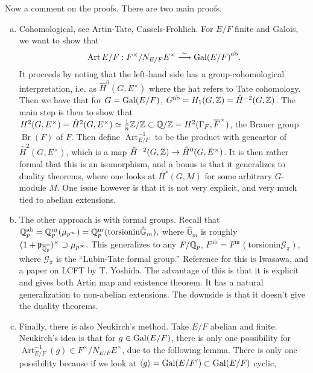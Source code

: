 Now a comment on the proofs. There are two main proofs.
\begin{enumerate}[(a)]
  \item Cohomological, see Artin-Tate, Cassels-Frohlich. For $E/F$ finite and
    Galois, we want to show that \[ \operatorname{Art}{E/F} : F^\times/N_{E/F}
    E^\times \stackrel{\sim}{\longrightarrow} \mathrm{Gal}{(E / F)}^{\operatorname{ab}}. \] It proceeds by noting
    that the left-hand side has a group-cohomological interpretation, i.e. as
    $\hat{H}^0(G, E^\times)$ where the hat refers to Tate cohomology. Then we
    have that for $G = \mathrm{Gal}{(E / F)}$, $G^{\operatorname{ab}} = H_1(G, \mathbb{Z}) =
    \hat{H}^{-2}(G, \mathbb{Z})$. The main step is then to show that $H^2(G,
    E^\times) = \hat{H}^2(G, E^\times) \simeq \frac{1}{n} \mathbb{Z}/\mathbb{Z} \subset
    \mathbb{Q}/\mathbb{Z} = H^2(\Gamma_F, \overline{F}^\times)$, the Brauer group
    $\operatorname{Br}(F)$ of $F$. Then define $\operatorname{Art}_{E/F}^{-1}$
    to be the product with geneartor of $\hat{H}^2(G, E^\times)$, which is a map
    $\hat{H}^{-2}(G, \mathbb{Z}) \rightarrow \hat{H}^0(G, E^\times)$. It is then
    rather formal that this is an isomorphism, and a bonus is that it
    generalizes to duality theorems, where one looks at $H^*(G,
    M)$ for some arbitrary $G$-module $M$. One issue however is that it is not
    very explicit, and very much tied to abelian extensions.
  \item The other approach is with formal groups. Recall that
    $\mathbb{Q}_p^{\operatorname{ab}} = \mathbb{Q}_p^{\operatorname{nr}}(\mu_{p^\infty}) =
    \mathbb{Q}_p^{\operatorname{nr}}(\mathrm{torsion in } \hat{\mathbb{G}}_m),$ where
    $\hat{\mathbb{G}}_m$ is roughly $(1 + \mathfrak{p}_{\overline{\mathbb{Q}_p}})^\times
    \supset \mu_{p^{\infty}}.$ This generalizes to any $F/\mathbb{Q}_p$,
    $F^{\operatorname{ab}} = F^{\operatorname{nr}}(\mathrm{torsion in }
    \mathcal{G}_\pi)$, where $\mathcal{G}_\pi$ is the ``Lubin-Tate formal
    group.'' Reference for this is Iwasawa, and a paper on LCFT by T. Yoshida.
    The advantage of this is that it is explicit and gives both Artin map and
    existence theorem. It has a natural generalization to non-abelian
    extensions. The downside is that it doesn't give the duality theorems.
  \item Finally, there is also Neukirch's method. Take $E/F$ abelian and finite.
    Neukirch's idea is that for $g \in \mathrm{Gal}{(E / F)}$, there is only one
    possibility for $\operatorname{Art}_{E/F}^{-1}(g) \in F^\times/N_{E/F}
    E^\times$, due to the following lemma. There is only one possibility because
    if we look at $\langle g \rangle = \mathrm{Gal}{(E / F')} \subset \mathrm{Gal}{(E / F)}$ cyclic,

\end{enumerate}
